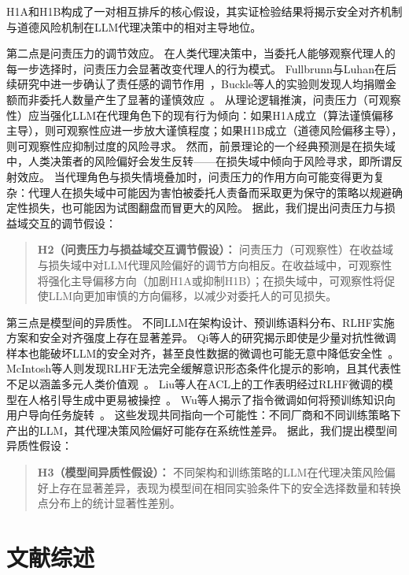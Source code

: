 \documentclass[journal]{vgtc}
\begin{document}
H1A和H1B构成了一对相互排斥的核心假设，其实证检验结果将揭示安全对齐机制与道德风险机制在LLM代理决策中的相对主导地位。

第二点是问责压力的调节效应。
在人类代理决策中，当委托人能够观察代理人的每一步选择时，问责压力会显著改变代理人的行为模式。
Fullbrunn与Luhan在后续研究中进一步确认了责任感的调节作用~\cite{Fullbrunn2019Responsibility}，Buckle等人的实验则发现人均捐赠金额而非委托人数量产生了显著的谨慎效应~\cite{Buckle2024Needs}。
从理论逻辑推演，问责压力（可观察性）应当强化LLM在代理角色下的现有行为倾向：如果H1A成立（算法谨慎偏移主导），则可观察性应进一步放大谨慎程度；如果H1B成立（道德风险偏移主导），则可观察性应抑制过度的风险寻求。
然而，前景理论的一个经典预测是在损失域中，人类决策者的风险偏好会发生反转——在损失域中倾向于风险寻求，即所谓反射效应。
当代理角色与损失情境叠加时，问责压力的作用方向可能变得更为复杂：代理人在损失域中可能因为害怕被委托人责备而采取更为保守的策略以规避确定性损失，也可能因为试图翻盘而冒更大的风险。
据此，我们提出问责压力与损益域交互的调节假设：
\begin{quote}
\textbf{H2（问责压力与损益域交互调节假设）：} 问责压力（可观察性）在收益域与损失域中对LLM代理风险偏好的调节方向相反。在收益域中，可观察性将强化主导偏移方向（加剧H1A或抑制H1B）；在损失域中，可观察性将促使LLM向更加审慎的方向偏移，以减少对委托人的可见损失。
\end{quote}

第三点是模型间的异质性。
不同LLM在架构设计、预训练语料分布、RLHF实施方案和安全对齐强度上存在显著差异。
Qi等人的研究揭示即使是少量对抗性微调样本也能破坏LLM的安全对齐，甚至良性数据的微调也可能无意中降低安全性~\cite{Qi2024Finetuning}。
McIntosh等人则发现RLHF无法完全缓解意识形态条件化提示的影响，且其代表性不足以涵盖多元人类价值观~\cite{McIntosh2024Inadequacy}。
Liu等人在ACL上的工作表明经过RLHF微调的模型在人格引导生成中更易被操控~\cite{Liu2024Evaluating}。
Wu等人揭示了指令微调如何将预训练知识向用户导向任务旋转~\cite{Wu2024Language}。
这些发现共同指向一个可能性：不同厂商和不同训练策略下产出的LLM，其代理决策风险偏好可能存在系统性差异。
据此，我们提出模型间异质性假设：
\begin{quote}
\textbf{H3（模型间异质性假设）：} 不同架构和训练策略的LLM在代理决策风险偏好上存在显著差异，表现为模型间在相同实验条件下的安全选择数量和转换点分布上的统计显著性差别。
\end{quote}

\section{文献综述}
\end{document}

